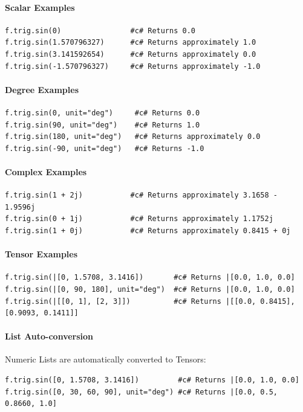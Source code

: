 \paragraph{Scalar Examples}
\begin{verbatim}
f.trig.sin(0)                #c# Returns 0.0
f.trig.sin(1.570796327)      #c# Returns approximately 1.0
f.trig.sin(3.141592654)      #c# Returns approximately 0.0
f.trig.sin(-1.570796327)     #c# Returns approximately -1.0
\end{verbatim}

\paragraph{Degree Examples}
\begin{verbatim}
f.trig.sin(0, unit="deg")     #c# Returns 0.0
f.trig.sin(90, unit="deg")    #c# Returns 1.0
f.trig.sin(180, unit="deg")   #c# Returns approximately 0.0
f.trig.sin(-90, unit="deg")   #c# Returns -1.0
\end{verbatim}

\paragraph{Complex Examples}
\begin{verbatim}
f.trig.sin(1 + 2j)           #c# Returns approximately 3.1658 - 1.9596j
f.trig.sin(0 + 1j)           #c# Returns approximately 1.1752j
f.trig.sin(1 + 0j)           #c# Returns approximately 0.8415 + 0j
\end{verbatim}

\paragraph{Tensor Examples}
\begin{verbatim}
f.trig.sin(|[0, 1.5708, 3.1416])       #c# Returns |[0.0, 1.0, 0.0]
f.trig.sin(|[0, 90, 180], unit="deg")  #c# Returns |[0.0, 1.0, 0.0]
f.trig.sin(|[[0, 1], [2, 3]])          #c# Returns |[[0.0, 0.8415], [0.9093, 0.1411]]
\end{verbatim}

\paragraph{List Auto-conversion}
Numeric Lists are automatically converted to Tensors:
\begin{verbatim}
f.trig.sin([0, 1.5708, 3.1416])         #c# Returns |[0.0, 1.0, 0.0]
f.trig.sin([0, 30, 60, 90], unit="deg") #c# Returns |[0.0, 0.5, 0.8660, 1.0]
\end{verbatim}

